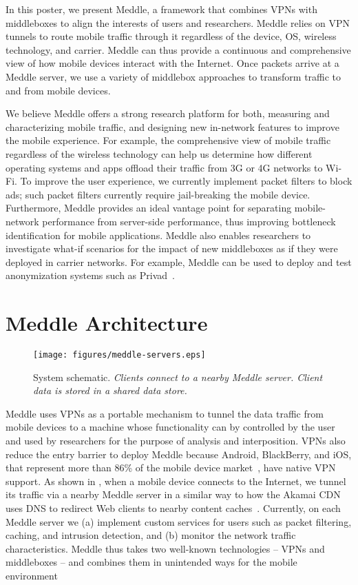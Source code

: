 \documentclass{sig-alternate}
\newcommand{\meddle}{{Meddle}\xspace}
\renewcommand{\fref}{\Fref}
\begin{document}
In this poster, we present \meddle, a framework that combines
VPNs with middleboxes to align the interests of users and
researchers. \meddle relies on VPN tunnels to route mobile traffic
through it regardless of the device, OS, wireless technology, and
carrier. \meddle can thus provide a continuous and
comprehensive view of how mobile devices interact with the
Internet. Once packets arrive at a \meddle server, we use a variety of
middlebox approaches to transform traffic to and from mobile devices.

We believe \meddle offers a strong research platform for both,
measuring and characterizing mobile traffic, and designing new
in-network features to improve the mobile experience. For example, the
comprehensive view of mobile traffic regardless of the wireless
technology can help us determine how different operating systems and
apps offload their traffic from 3G or 4G networks to Wi-Fi. To
improve the user experience, we currently implement packet filters
to block ads; such packet filters currently require jail-breaking the
mobile device. Furthermore, Meddle provides an ideal vantage point for
separating mobile-network performance from server-side performance,
thus improving bottleneck identification for mobile
applications. \meddle also enables researchers to investigate what-if
scenarios for the impact of new middleboxes as if they were deployed
in carrier networks. For example, \meddle can be used to deploy and
test anonymization systems such as Privad~\cite{guha:privad}. 

\section{\meddle Architecture}

\begin{figure}
  \centering
  \texttt{[image: figures/meddle-servers.eps]}
  \caption{System schematic. \emph{Clients connect to a nearby \meddle
      server. Client data is stored in a shared data store.}} 
  \label{fig:MeddleDeployment}
\vspace{-0.08in}
\end{figure}

\meddle uses VPNs as a portable mechanism to tunnel the data traffic
from mobile devices to a machine whose functionality can by controlled
by the user and used by researchers for the purpose of analysis and
interposition. VPNs also reduce the entry barrier to deploy \meddle
because Android, BlackBerry, and iOS, that represent more than 86\% of
the mobile device market~\cite{gartner-phone-share}, have native VPN
support. As shown in \fref{fig:MeddleDeployment}, when a mobile device
connects to the Internet, we tunnel its traffic via a nearby \meddle
server in a similar way to how the Akamai CDN uses DNS to redirect Web
clients to nearby content caches~\cite{akamai:cdn}. Currently, on each
\meddle server we (a) implement custom services for users such as
packet filtering, caching, and intrusion detection, and (b) monitor the
network traffic characteristics. \meddle thus takes two well-known
technologies -- VPNs and middleboxes -- and combines them in
unintended ways for the mobile environment
\end{document}
